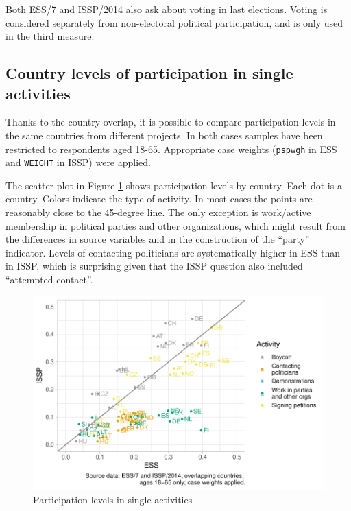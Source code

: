 \documentclass[12pt,]{article}
\begin{document}
Both ESS/7 and ISSP/2014 also ask about voting in last elections. Voting is considered separately from non-electoral political participation, and is only used in the third measure.

\hypertarget{country-levels-of-participation-in-single-activities}{%
\subsection{Country levels of participation in single activities}\label{country-levels-of-participation-in-single-activities}}

Thanks to the country overlap, it is possible to compare participation levels in the same countries from different projects. In both cases samples have been restricted to respondents aged 18-65. Appropriate case weights (\texttt{pspwgh} in ESS and \texttt{WEIGHT} in ISSP) were applied.

The scatter plot in Figure \ref{fig:part-rate-dot-plot} shows participation levels by country. Each dot is a country. Colors indicate the type of activity. In most cases the points are reasonably close to the 45-degree line. The only exception is work/active membership in political parties and other organizations, which might result from the differences in source variables and in the construction of the ``party'' indicator. Levels of contacting politicians are systematically higher in ESS than in ISSP, which is surprising given that the ISSP question also included ``attempted contact''.

\begin{figure}[H]

{\centering \includegraphics{report_files/figure-latex/part-rate-dot-plot-1} 

}

\caption{Participation levels in single activities}\label{fig:part-rate-dot-plot}
\end{figure}
\end{document}
